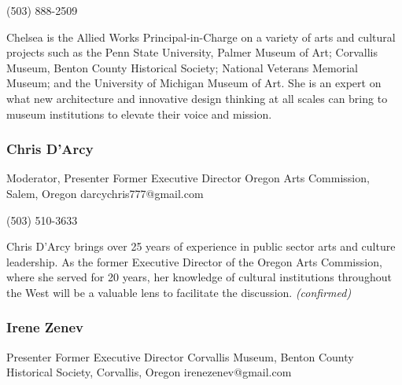 \documentclass{report}
\begin{document}
              (503) 888-2509\newline

              Chelsea is the Allied Works Principal-in-Charge on a variety of arts and cultural projects such as the Penn State University, Palmer Museum of Art; Corvallis Museum, Benton County Historical Society; National Veterans Memorial Museum; and the University of Michigan Museum of Art. She is an expert on what new architecture and innovative design thinking at all scales can bring to museum institutions to elevate their voice and mission.\newline


              
                \subsubsection*{ Chris D'Arcy }
                Moderator, Presenter\newline
                Former Executive Director\newline
                Oregon Arts Commission, Salem, Oregon
                \newline
                darcychris777@gmail.com\newline
                
                (503) 510-3633\newline

                Chris D’Arcy brings over 25 years of experience in public sector arts and culture leadership. As the former Executive Director of the Oregon Arts Commission, where she served for 20 years, her knowledge of cultural institutions throughout the West will be a valuable lens to facilitate the discussion.\newline
                \emph{ (confirmed) }
              

              
                \subsubsection*{ Irene Zenev }
                Presenter\newline
                Former Executive Director\newline
                Corvallis Museum, Benton County Historical Society, Corvallis, Oregon
                \newline
                irenezenev@gmail.com\newline
                
\end{document}
